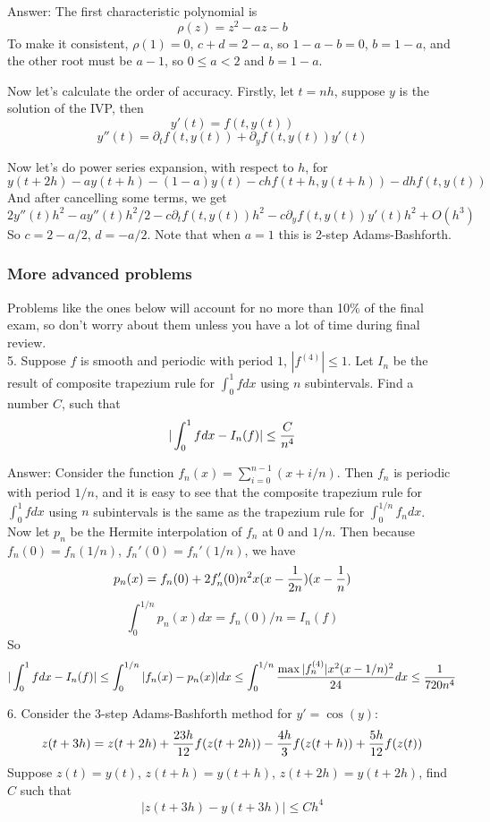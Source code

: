 \documentclass{article} %
\theoremstyle{break}
\begin{document}
Answer: The first characteristic polynomial is
\[\rho(z)=z^2-az-b\]
To make it consistent, $\rho(1)=0$, $c+d=2-a$, so $1-a-b=0$, $b=1-a$, and the other root must be $a-1$, so $0\leq a<2$ and $b=1-a$.

Now let's calculate the order of accuracy. Firstly, let $t=nh$, suppose $y$ is the solution of the IVP, then
\[y'(t)=f(t, y(t))\]
\[y''(t)=\partial_tf(t, y(t))+\partial_yf(t, y(t))y'(t)\]

Now let's do power series expansion, with respect to $h$, for
\[y(t+2h)-ay(t+h)-(1-a)y(t)-chf(t+h, y(t+h))-dhf(t, y(t))\]
And after cancelling some terms, we get
\[2y''(t)h^2-ay''(t)h^2/2-c\partial_t f(t, y(t))h^2-c\partial_y f(t, y(t))y'(t)h^2+O(h^3)\]
So $c=2-a/2$, $d=-a/2$. Note that when $a=1$ this is 2-step Adams-Bashforth.\\


\subsubsection{More advanced problems}

Problems like the ones below will account for no more than 10\% of the final exam, so don't worry about them unless you have a lot of time during final review.\\

5. Suppose $f$ is smooth and periodic with period $1$, $|f^{(4)}|\leq 1$. Let $I_n$ be the result of composite trapezium rule for $\int_0^1fdx$ using $n$ subintervals. Find a number $C$, such that
\[|\int_0^1fdx-I_n(f)|\leq {C\over n^4}\]

Answer: Consider the function $f_n(x)=\sum_{i=0}^{n-1}(x+i/n)$. Then $f_n$ is periodic with period $1/n$, and it is easy to see that the composite trapezium rule for $\int_0^1fdx$ using $n$ subintervals is the same as the trapezium rule for $\int_0^{1/n}f_ndx$.\\

Now let $p_n$ be the Hermite interpolation of $f_n$ at $0$ and $1/n$. Then because $f_n(0)=f_n(1/n)$, $f_n'(0)=f_n'(1/n)$, we have
\[p_n(x)=f_n(0)+2f'_n(0)n^2x(x-{1\over 2n})(x-{1\over n})\]
\[\int_0^{1/n}p_n(x)dx=f_n(0)/n=I_n(f)\]
So
\[|\int_0^1fdx-I_n(f)|\leq \int_0^{1/n}|f_n(x)-p_n(x)|dx\leq \int_0^{1/n}{\max|f_n^{(4)}|x^2(x-1/n)^2\over 24}dx\leq {1\over 720n^4}\]

6. Consider the 3-step Adams-Bashforth method for $y'=\cos(y)$:
\[z(t+3h)=z(t+2h)+{23h\over 12}f(z(t+2h))-{4h\over 3}f(z(t+h))+{5h\over 12}f(z(t))\]
Suppose $z(t)=y(t)$, $z(t+h)=y(t+h)$, $z(t+2h)=y(t+2h)$, find $C$ such that
\[|z(t+3h)-y(t+3h)|\leq Ch^4\]
\end{document}
